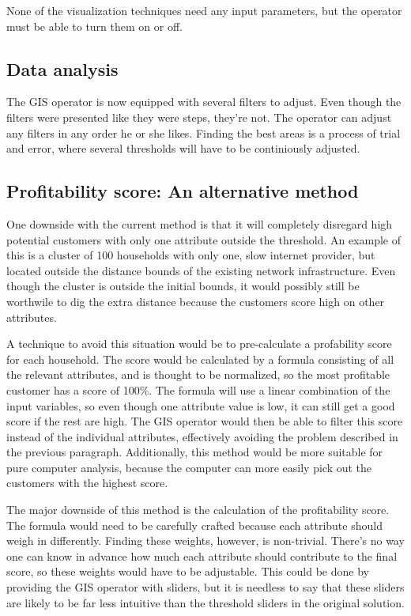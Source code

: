 \documentclass[twocolumn]{article}
\begin{document}
None of the visualization techniques need any input parameters, but the operator must be able to turn them on or off.

\subsection{Data analysis}
\label{sub:Data analysis}
The GIS operator is now equipped with several filters to adjust. Even though the filters were presented like they were steps, they're not. The operator can adjust any filters in any order he or she likes. Finding the best areas is a process of trial and error, where several thresholds will have to be continiously adjusted.

\subsection{Profitability score: An alternative method}
\label{sub:Profitability score: An alternate method}
One downside with the current method is that it will completely disregard high potential customers with only one attribute outside the threshold. An example of this is a cluster of 100 households with only one, slow internet provider, but located outside the distance bounds of the existing network infrastructure. Even though the cluster is outside the initial bounds, it would possibly still be worthwile to dig the extra distance because the customers score high on other attributes.

A technique to avoid this situation would be to pre-calculate a profability score for each household. The score would be calculated by a formula consisting of all the relevant attributes, and is thought to be normalized, so the most profitable customer has a score of 100\%. The formula will use a linear combination of the input variables, so even though one attribute value is low, it can still get a good score if the rest are high. The GIS operator would then be able to filter this score instead of the individual attributes, effectively avoiding the problem described in the previous paragraph. Additionally, this method would be more suitable for pure computer analysis, because the computer can more easily pick out the customers with the highest score.

The major downside of this method is the calculation of the profitability score. The formula would need to be carefully crafted because each attribute should weigh in differently. Finding these weights, however, is non-trivial. There's no way one can know in advance how much each attribute should contribute to the final score, so these weights would have to be adjustable. This could be done by providing the GIS operator with sliders, but it is needless to say that these sliders are likely to be far less intuitive than the threshold sliders in the original solution.
\end{document}
